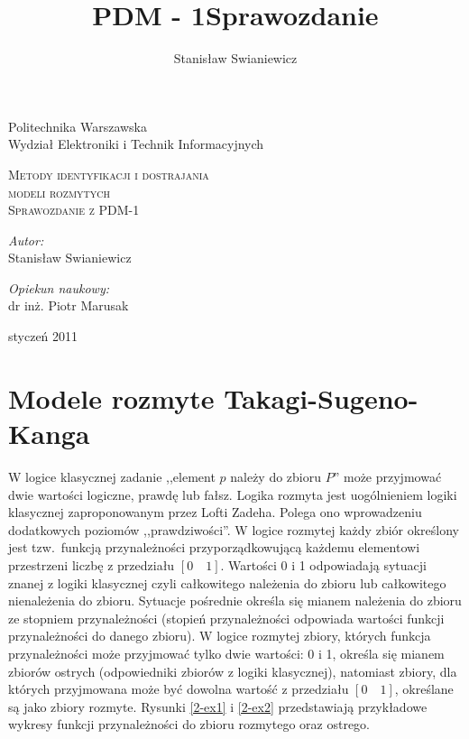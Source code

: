 \documentclass[a4paper,12pt,titlepage]{article}
\author{Stanisław Swianiewicz}
\title{PDM - 1\linebreak Sprawozdanie}
\date{ }
\begin{document}
\begin{titlepage}

\vfill
\vspace*{1cm}
    \begin{center}\small
    Politechnika Warszawska\\
    Wydział Elektroniki i Technik Informacyjnych\\
    \end{center}
    \vspace{3cm}
    \noindent
    \begin{center}
      \LARGE \textsc{Metody identyfikacji i dostrajania \\ modeli rozmytych} \\
      \vspace{0.5cm}
      \Large \textsc{Sprawozdanie z PDM-1}
         \end{center}
    \vspace{0.5cm}
    \begin{minipage}{5cm}
    \textit{\small Autor:}\\
    \normalsize Stanisław Swianiewicz 
    \end{minipage}
    \hspace{7cm}
    \begin{minipage}{5cm}
    \textit{\small Opiekun naukowy:}\\
    \normalsize dr inż. Piotr Marusak 
    \end{minipage}
    \begin{center}
    styczeń 2011
    \end{center}

\end{titlepage}

\section{Modele rozmyte Takagi-Sugeno-Kanga}

W logice klasycznej zadanie ,,element $p$ należy do zbioru $P$'' może przyjmować dwie wartości logiczne, prawdę lub fałsz. Logika rozmyta jest uogólnieniem logiki klasycznej zaproponowanym przez Lofti Zadeha. Polega ono wprowadzeniu dodatkowych poziomów ,,prawdziwości''. W logice rozmytej każdy zbiór określony jest tzw.\ funkcją przynależności przyporządkowującą każdemu elementowi przestrzeni liczbę z przedziału $[0\quad 1]$. Wartości 0 i 1 odpowiadają sytuacji znanej z logiki klasycznej czyli całkowitego należenia do zbioru lub całkowitego nienależenia do zbioru. Sytuacje pośrednie określa się mianem należenia do zbioru ze stopniem przynależności (stopień przynależności odpowiada wartości funkcji przynależności do danego zbioru). W logice rozmytej zbiory, których funkcja przynależności może przyjmować tylko dwie wartości: 0 i 1, określa się mianem zbiorów ostrych (odpowiedniki zbiorów z logiki klasycznej), natomiast zbiory, dla których przyjmowana może być dowolna wartość z przedziału $[0\quad 1]$, określane są jako zbiory rozmyte. Rysunki \ref{2-ex1} i \ref{2-ex2} przedstawiają przykładowe wykresy funkcji przynależności do zbioru rozmytego oraz ostrego.
\end{document}
